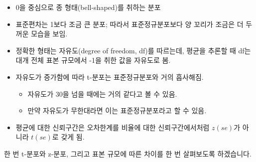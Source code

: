\documentclass[]{book}
\providecommand{\tightlist}{%
  \setlength{\itemsep}{0pt}\setlength{\parskip}{0pt}}
\begin{document}
\begin{itemize}
\item
  0을 중심으로 종 형태(bell-shaped)를 취하는 분포
\item
  표준편차는 1보다 조금 큰 분포; 따라서 표준정규분포보다 양 꼬리가 조금은 더 두꺼운 모습을 보임.
\item
  정확한 형태는 자유도(degree of freedom, df)를 따르는데, 평균을 추론할 때 df는 대개 전체 표본 규모에서 -1을 취한 값을 자유도로 봄.
\item
  자유도가 증가함에 따라 t-분포는 표준정규분포와 거의 흡사해짐.

  \begin{itemize}
  \tightlist
  \item
    자유도가 30을 넘을 때에는 거의 같다고 볼 수 있음.
  \item
    만약 자유도가 무한대라면 이는 표준정규분포라고 할 수 있음.
  \end{itemize}
\item
  평균에 대한 신뢰구간은 오차한계를 비율에 대한 신뢰구간에서처럼 \(z(se)\)가 아니라 \(t(se)\)로 갖게 됨.
\end{itemize}

한 번 t-분포와 z-분포, 그리고 표본 규모에 따른 차이를 한 번 살펴보도록 하겠습니다.
\end{document}
